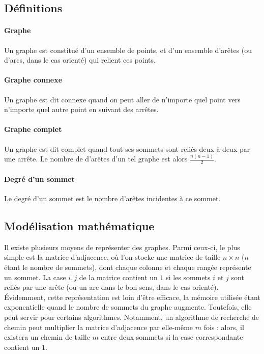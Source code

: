 \subsection{Définitions}
  \paragraph{Graphe} Un graphe est constitué d'un ensemble de points, et d'un ensemble
  d'arêtes (ou d'arcs, dans le cas orienté) qui relient ces points.

  \paragraph{Graphe connexe} Un graphe est dit connexe quand on peut aller de
  n'importe quel point vers n'importe quel autre point en suivant des arrêtes.

  \paragraph{Graphe complet} Un graphe est dit complet quand tout
  ses sommets sont reliés deux à deux par une arrête. Le nombre de d'arêtes
  d'un tel graphe est alors $\frac {n(n-1)} 2$.

  \paragraph{Degré d'un sommet} Le degré d'un sommet est le nombre d'arêtes
  incidentes à ce sommet.

\subsection{Modélisation mathématique}
Il existe plusieurs moyens de représenter des graphes. Parmi ceux-ci,
le plus simple est la matrice d'adjacence, où l'on stocke une matrice
de taille $n\times n$ ($n$ étant le nombre de sommets), dont chaque
colonne et chaque rangée représente un sommet. La case $i, j$ de la
matrice contient un $1$ si les sommets $i$ et $j$ sont reliés par une
arête (ou un arc dans le bon sens, dans le cas orienté). Évidemment,
cette représentation est loin d'être efficace, la mémoire utilisée
étant exponentielle quand le nombre de sommets du graphe
augmente. Toutefois, elle peut servir pour certains
algorithmes. Notamment, un algorithme de recherche de chemin peut
multiplier la matrice d'adjacence par elle-même $m$ fois : alors, il
existera un chemin de taille $m$ entre deux sommets si la case
correspondante contient un $1$.

